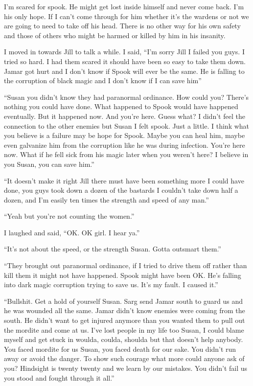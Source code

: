 I'm scared for spook. He might get lost inside himself and never come back. I'm his only hope. If I can't come through for him whether it's the wardens or not we are going to need to take off his head. There is no other way for his own safety and those of others who might be harmed or killed by him in his insanity.

I moved in towards Jill to talk a while. I said, ``I'm sorry Jill I failed you guys. I tried so hard. I had them scared it should have been so easy to take them down. Jamar got hurt and I don't know if Spook will ever be the same. He is falling to the corruption of black magic and I don't know if I can save him''

``Susan you didn't know they had paranormal ordinance. How could you? There's nothing you could have done. What happened to Spook would have happened eventually. But it happened now. And you're here. Guess what? I didn't feel the connection to the other enemies but Susan I felt spook. Just a little. I think what you believe is a failure may be hope for Spook. Maybe you can heal him, maybe even galvanize him from the corruption like he was during infection. You're here now. What if he fell sick from his magic later when you weren't here? I believe in you Susan, you can save him.''

``It doesn't make it right Jill there must have been something more I could have done, you guys took down a dozen of the bastards I couldn't take down half a dozen, and I'm easily ten times the strength and speed of any man.''

``Yeah but you're not counting the women.''

I laughed and said, ``OK. OK girl. I hear ya.''

``It's not about the speed, or the strength Susan. Gotta outsmart them.''

``They brought out paranormal ordinance, if I tried to drive them off rather than kill them it might not have happened. Spook might have been OK. He's falling into dark magic corruption trying to save us. It's my fault. I caused it.''

``Bullshit. Get a hold of yourself Susan. Sarg send Jamar south to guard us and he was wounded all the same. Jamar didn't know enemies were coming from the south. He didn't want to get injured anymore than you wanted them to pull out the mordite and come at us. I've lost people in my life too Susan, I could blame myself and get stuck in woulda, coulda, shoulda but that doesn't help anybody. You faced mordite for us Susan, you faced death for our sake. You didn't run away or avoid the danger. To show such courage what more could anyone ask of you? Hindsight is twenty twenty and we learn by our mistakes. You didn't fail us you stood and fought through it all.''

